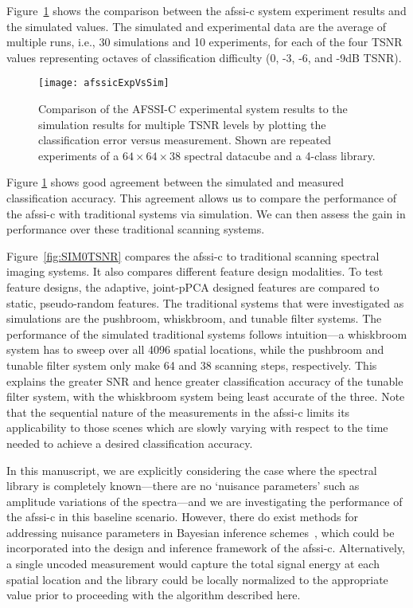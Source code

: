 Figure~\ref{fig:SIMmultiTSNR} shows the comparison between the \gls{afssi-c} system experiment results and the simulated values. The simulated and experimental data are the average of multiple runs, i.e., 30 simulations and 10 experiments, for each of the four TSNR values representing octaves of classification difficulty (0, -3, -6, and -9dB TSNR).
%
\begin{figure}[htb]
 	\centering
  	\texttt{[image: afssicExpVsSim]}\\
  	\caption{Comparison of the AFSSI-C experimental system results to the simulation results for multiple TSNR levels by plotting the classification error versus measurement. Shown are repeated experiments of a $64 \times 64 \times 38$ spectral datacube and a 4-class library.}\label{fig:SIMmultiTSNR}
\end{figure}
%
Figure \ref{fig:SIMmultiTSNR} shows good agreement between the  simulated and measured classification accuracy. This agreement allows us to compare the performance of the \gls{afssi-c} with traditional systems via simulation. We can then assess the gain in performance over these traditional scanning systems.

Figure~\ref{fig:SIM0TSNR} compares the \gls{afssi-c} to traditional scanning spectral imaging systems. It also compares different feature design modalities. To test feature designs, the adaptive, joint-pPCA designed features are compared to static, pseudo-random features. The traditional systems that were investigated as simulations are the pushbroom, whiskbroom, and tunable filter systems. The performance of the simulated traditional systems follows intuition---a whiskbroom system has to sweep over all 4096 spatial locations, while the pushbroom and tunable filter system only make 64 and 38 scanning steps, respectively. This explains the greater SNR and hence greater classification accuracy of the tunable filter system, with the whiskbroom system being least accurate of the three. Note that the sequential nature of the measurements in the \gls{afssi-c} limits its applicability to those scenes which are slowly varying with respect to the time needed to achieve a desired classification accuracy.

In this manuscript, we are explicitly considering the case where the spectral library is completely known---there are no \lq nuisance parameters\rq{}  such as amplitude variations of the spectra---and we are investigating the performance of the \gls{afssi-c} in this baseline scenario. However, there do exist methods for addressing nuisance parameters in Bayesian inference schemes~\cite{hernandez2014mind, hong2003classification}, which could be incorporated into the design and inference framework of the \gls{afssi-c}. Alternatively, a single uncoded measurement would capture the total signal energy at each spatial location and the library could be locally normalized to the appropriate value prior to proceeding with the algorithm described here.


